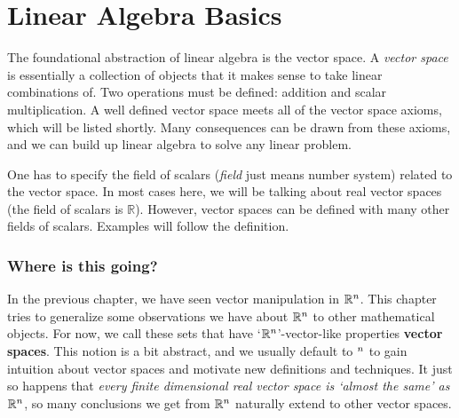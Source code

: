 \chapter{Linear Algebra Basics}

\setcounter{exercisecounter}{0}

\setcounter{thmcounter}{1}
    The foundational abstraction of linear algebra is the vector space. A \textit{vector space} is essentially a collection of objects that it
makes sense to take linear combinations of. Two operations must be defined: addition and scalar multiplication. A well defined
vector space meets all of the vector space axioms, which will be listed shortly. Many consequences can be drawn from these axioms,
and we can build up linear algebra to solve any linear problem.

\begin{remark}
	One has to specify the field of scalars (\textit{field} just means number system) related to the vector space. In most cases
here, we will be talking about real vector spaces (the field of scalars is $\mathbb{R}$). However, vector spaces can be defined with
many other fields of scalars. Examples will follow the definition.
\end{remark}
\subsection*{Where is this going?}
In the previous chapter, we have seen vector manipulation in $\mathbb{R}^n$. This chapter tries to generalize some observations we have about $\mathbb{R}^n$ to other mathematical objects.
For now, we call these sets that have `$\mathbb{R}^n$'-vector-like properties \textbf{vector spaces}. This notion is a bit abstract, and we usually default to $\real^n$
to gain intuition about vector spaces and motivate new definitions and techniques. It just so happens that \textit{every finite dimensional real vector space is `almost the same' as $\mathbb{R}^n$},
so many conclusions we get from $\mathbb{R}^n$ naturally extend to other vector spaces.


